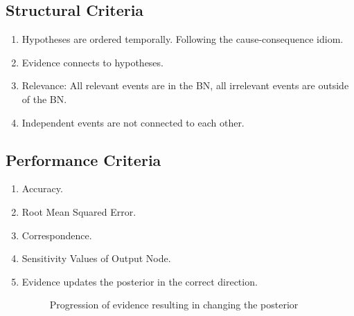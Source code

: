 \subsection{Structural Criteria}
\begin{enumerate}
\item Hypotheses are ordered temporally. Following the cause-consequence idiom.
\item Evidence connects to hypotheses.
\item Relevance: All relevant events are in the BN, all irrelevant events are outside of the BN.
\item Independent events are not connected to each other.
\end{enumerate}

\subsection{Performance Criteria}
\begin{enumerate}
\item Accuracy.
\item Root Mean Squared Error.
\item Correspondence.
\item Sensitivity Values of Output Node.
\item Evidence updates the posterior in the correct direction.
\begin{figure}[htbp]
 \centering
\caption{ Progression of evidence resulting in changing the posterior}
\label{baseposterior}
\end{figure}%
\end{enumerate}


